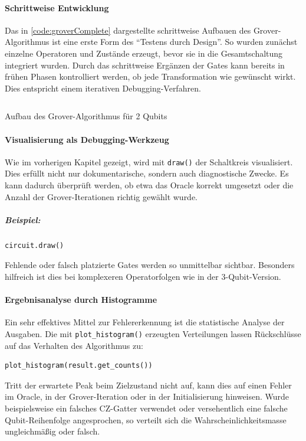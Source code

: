 \paragraph{Schrittweise Entwicklung} Das in \autoref{code:groverComplete} dargestellte schrittweise Aufbauen des Grover-Algorithmus ist eine erste Form des \enquote{Testens durch Design}. So wurden zunächst einzelne Operatoren und Zustände erzeugt, bevor sie in die Gesamtschaltung integriert wurden. Durch das schrittweise Ergänzen der Gates kann bereits in frühen Phasen kontrolliert werden, ob jede Transformation wie gewünscht wirkt. Dies entspricht einem iterativen Debugging-Verfahren.

\begin{listing}[ht!]
  \inputminted{python}{code/grover.py}
  \caption{Aufbau des Grover-Algorithmus für 2 Qubits}
  \label{code:groverComplete}
\end{listing}

\paragraph*{Visualisierung als Debugging-Werkzeug}
\mbox{}

Wie im vorherigen Kapitel gezeigt, wird mit \texttt{draw()} der Schaltkreis visualisiert. Dies erfüllt nicht nur dokumentarische, sondern auch diagnostische Zwecke. Es kann dadurch überprüft werden, ob etwa das Oracle korrekt umgesetzt oder die Anzahl der Grover-Iterationen richtig gewählt wurde.
\subparagraph*{Beispiel:}
\begin{verbatim}
circuit.draw()
\end{verbatim}
Fehlende oder falsch platzierte Gates werden so unmittelbar sichtbar. Besonders hilfreich ist dies bei komplexeren Operatorfolgen wie in der 3-Qubit-Version.

\paragraph*{Ergebnisanalyse durch Histogramme}
\mbox{}

Ein sehr effektives Mittel zur Fehlererkennung ist die statistische Analyse der Ausgaben. Die mit \texttt{plot\_histogram()} erzeugten Verteilungen lassen Rückschlüsse auf das Verhalten des Algorithmus zu:
\begin{verbatim}
plot_histogram(result.get_counts())
\end{verbatim}
Tritt der erwartete Peak beim Zielzustand nicht auf, kann dies auf einen Fehler im Oracle, in der Grover-Iteration oder in der Initialisierung hinweisen. Wurde beispielsweise ein falsches CZ-Gatter verwendet oder versehentlich eine falsche Qubit-Reihenfolge angesprochen, so verteilt sich die Wahrscheinlichkeitsmasse ungleichmäßig oder falsch.

